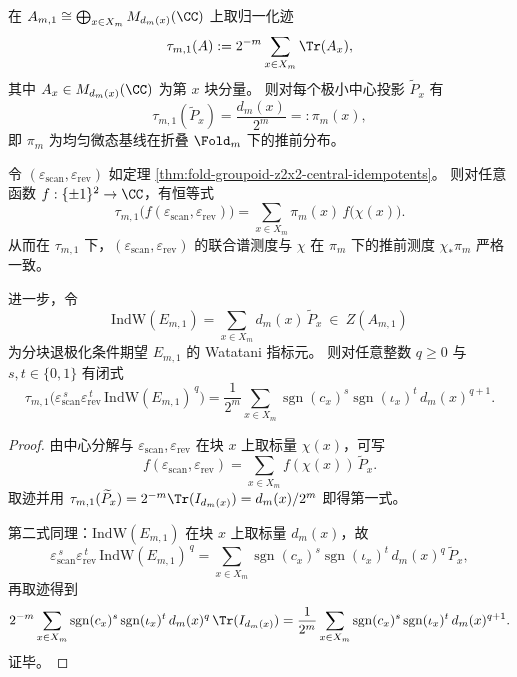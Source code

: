 \begin{theorem}\label{thm:fold-groupoid-z2x2-joint-spectral-measure}
在 \(A_{m,1}\cong\bigoplus_{x\in X_m}M_{d_m(x)}(\CC)\) 上取归一化迹
\[
\tau_{m,1}(A):=2^{-m}\sum_{x\in X_m}\Tr(A_x),
\]
其中 \(A_x\in M_{d_m(x)}(\CC)\) 为第 \(x\) 块分量。
则对每个极小中心投影 \(\widetilde P_x\) 有
\[
\tau_{m,1}(\widetilde P_x)=\frac{d_m(x)}{2^m}=: \pi_m(x),
\]
即 \(\pi_m\) 为均匀微态基线在折叠 \(\Fold_m\) 下的推前分布。
\par
令 \((\varepsilon_{\mathrm{scan}},\varepsilon_{\mathrm{rev}})\) 如定理 \ref{thm:fold-groupoid-z2x2-central-idempotents}。
则对任意函数 \(f:\{\pm1\}^2\to\CC\)，有恒等式
\[
\tau_{m,1}\!\bigl(f(\varepsilon_{\mathrm{scan}},\varepsilon_{\mathrm{rev}})\bigr)
=\sum_{x\in X_m}\pi_m(x)\,f\!\bigl(\chi(x)\bigr).
\]
从而在 \(\tau_{m,1}\) 下，\((\varepsilon_{\mathrm{scan}},\varepsilon_{\mathrm{rev}})\) 的联合谱测度与 \(\chi\) 在 \(\pi_m\) 下的推前测度 \(\chi_\ast\pi_m\) 严格一致。
\par
进一步，令
\[
\mathrm{IndW}(E_{m,1})=\sum_{x\in X_m} d_m(x)\,\widetilde P_x\ \in\ Z(A_{m,1})
\]
为分块退极化条件期望 \(E_{m,1}\) 的 Watatani 指标元。
则对任意整数 \(q\ge 0\) 与 \(s,t\in\{0,1\}\) 有闭式
\[
\tau_{m,1}\!\bigl(\varepsilon_{\mathrm{scan}}^{\,s}\varepsilon_{\mathrm{rev}}^{\,t}\,\mathrm{IndW}(E_{m,1})^{\,q}\bigr)
=
\frac{1}{2^m}\sum_{x\in X_m}\operatorname{sgn}(c_x)^{s}\operatorname{sgn}(\iota_x)^{t}\,d_m(x)^{q+1}.
\]
\end{theorem}

\begin{proof}
由中心分解与 \(\varepsilon_{\mathrm{scan}},\varepsilon_{\mathrm{rev}}\) 在块 \(x\) 上取标量 \(\chi(x)\)，可写
\[
f(\varepsilon_{\mathrm{scan}},\varepsilon_{\mathrm{rev}})
=\sum_{x\in X_m} f(\chi(x))\,\widetilde P_x.
\]
取迹并用 \(\tau_{m,1}(\widetilde P_x)=2^{-m}\Tr(I_{d_m(x)})=d_m(x)/2^m\) 即得第一式。
\par
第二式同理：\(\mathrm{IndW}(E_{m,1})\) 在块 \(x\) 上取标量 \(d_m(x)\)，故
\[
\varepsilon_{\mathrm{scan}}^{\,s}\varepsilon_{\mathrm{rev}}^{\,t}\,\mathrm{IndW}(E_{m,1})^{\,q}
=\sum_{x\in X_m}\operatorname{sgn}(c_x)^s\operatorname{sgn}(\iota_x)^t\,d_m(x)^q\,\widetilde P_x,
\]
再取迹得到
\[
2^{-m}\sum_{x\in X_m}\operatorname{sgn}(c_x)^s\operatorname{sgn}(\iota_x)^t\,d_m(x)^q\,\Tr(I_{d_m(x)})
=\frac{1}{2^m}\sum_{x\in X_m}\operatorname{sgn}(c_x)^s\operatorname{sgn}(\iota_x)^t\,d_m(x)^{q+1}.
\]
证毕。
\end{proof}

